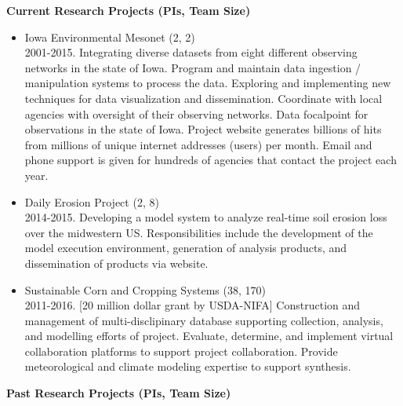 \vspace*{0.25in}
\Large \bf Current Research Projects (PIs, Team Size)
\normalsize \sf
\begin{itemize}
\item Iowa Environmental Mesonet (2, 2)\\
2001-2015. Integrating diverse datasets from eight
different observing networks in the state of Iowa.  Program and maintain data
ingestion / manipulation systems to process the data. Exploring and implementing 
new techniques for data visualization and dissemination.  Coordinate with local
agencies with oversight of their observing networks.  Data focalpoint for 
observations in the state of Iowa. Project website generates billions of hits 
from millions of unique internet addresses (users) per month.  Email and 
phone support is given for hundreds of agencies that contact the project each
year.
\item Daily Erosion Project (2, 8)\\
2014-2015. Developing a model system to analyze real-time soil erosion loss over the 
midwestern US.  Responsibilities include the development of the model execution
environment, generation of analysis products, and dissemination of products 
via website.
\item Sustainable Corn and Cropping Systems (38, 170)\\
2011-2016. [20 million dollar grant by USDA-NIFA] Construction and management of multi-disclipinary database supporting collection, analysis, and modelling efforts of project. 
Evaluate, determine, and implement virtual collaboration platforms to 
support project collaboration.  Provide meteorological and climate modeling
expertise to support synthesis.
\end{itemize}
\vspace*{0.25in}
\Large \bf Past Research Projects (PIs, Team Size)
\normalsize \sf
